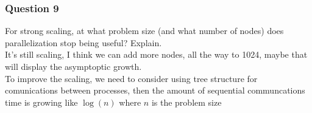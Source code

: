 \documentclass[]{article}
\begin{document}
        \subsubsection*{Question 9}
            For strong scaling, at what problem size (and what number of nodes) does parallelization stop being useful? Explain.
            \\[1.1em]
            It's still scaling, I think we can add more nodes, all the way to 1024, maybe that will display the asymptoptic growth. 
            \\[1.1em]
            To improve the scaling, we need to consider using tree structure for comunications between processes, then the amount of sequential communcations time is growing like $\log(n)$ where $n$ is the problem size


    
\end{document}
